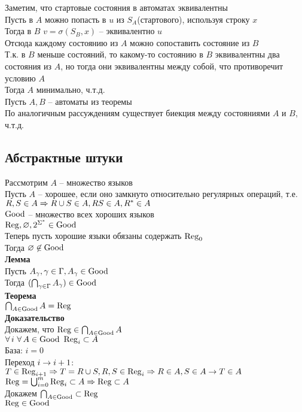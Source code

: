 \documentclass[12pt]{article}
\begin{document}
Заметим, что стартовые состояния в автоматах эквивалентны\\
Пусть в $A$ можно попасть в $u$ из $S_A$(стартового), используя строку $x$\\
Тогда в $B$ $v = \sigma(S_B, x)$ -- эквивалентно $u$\\
Отсюда каждому состоянию из $A$ можно сопоставить состояние из $B$\\
Т.к. в $B$ меньше состояний, то какому-то состоянию в $B$ эквивалентны два состояния из $A$, но тогда они эквивалентны между собой, что противоречит условию $A$\\
Тогда $A$ минимально, ч.т.д.\\
Пусть $A, B$ -- автоматы из теоремы\\
По аналогичным рассуждениям существует биекция между состояниями $A$ и $B$, ч.т.д.
\subsection{Абстрактные штуки}
Рассмотрим $A$ -- множество языков\\
Пусть $A$ -- хорошее, если оно замкнуто относительно регулярных операций, т.е. $R, S \in A \Rightarrow R \cup S \in A, RS \in A, R^* \in A$\\
$\operatorname{Good}$ -- множество всех хороших языков\\
$\operatorname{Reg}, \varnothing, 2^{\Sigma^*} \in \operatorname{Good}$\\
Теперь пусть хорошие языки обязаны содержать $\operatorname{Reg}_0$\\
Тогда $\varnothing \not\in \operatorname{Good}$\\
\textbf{Лемма}\\
Пусть $A_\gamma, \gamma \in \Gamma, A_\gamma \in \operatorname{Good}$\\
Тогда $(\bigcap_{\gamma \in \Gamma} A_\gamma) \in \operatorname{Good}$\\
\textbf{Теорема}\\
$\bigcap_{A\in \operatorname{Good}} A = \operatorname{Reg}$\\
\textbf{Доказательство}\\
Докажем, что $\operatorname{Reg} \in \bigcap_{A \in \operatorname{Good}} A$\\
$\forall\, i\ \forall\, A \in \operatorname{Good}\ \operatorname{Reg}_i \subset A$\\
База: $i = 0$\\
Переход $i \rightarrow i+1$:\\
$T \in \operatorname{Reg}_{i+1} \Rightarrow T = R\cup S, R, S \in \operatorname{Reg}_i \Rightarrow R \in A, S \in A \rightarrow T \in A$\\
$\operatorname{Reg} = \bigcup_{i=0}^m \operatorname{Reg}_i \subset A \Rightarrow \operatorname{Reg} \subset A$\\
Докажем $\bigcap_{A \in \operatorname{Good}} \subset \operatorname{Reg}$\\
$\operatorname{Reg} \in \operatorname{Good}$
\end{document}
